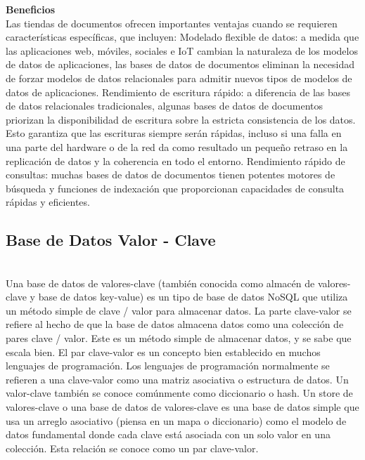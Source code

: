 \documentclass[twoside,onecolumn]{article}
\begin{document}
\begin{flushright}
\begin{itemize}
\textbf{Beneficios}\\
Las tiendas de documentos ofrecen importantes ventajas cuando se requieren características específicas, que incluyen:
Modelado flexible de datos: a medida que las aplicaciones web, móviles, sociales e IoT cambian la naturaleza de los modelos de datos de aplicaciones, las bases de datos de documentos eliminan la necesidad de forzar modelos de datos relacionales para admitir nuevos tipos de modelos de datos de aplicaciones.
Rendimiento de escritura rápido: a diferencia de las bases de datos relacionales tradicionales, algunas bases de datos de documentos priorizan la disponibilidad de escritura sobre la estricta consistencia de los datos. Esto garantiza que las escrituras siempre serán rápidas, incluso si una falla en una parte del hardware o de la red da como resultado un pequeño retraso en la replicación de datos y la coherencia en todo el entorno.
Rendimiento rápido de consultas: muchas bases de datos de documentos tienen potentes motores de búsqueda y funciones de indexación que proporcionan capacidades de consulta rápidas y eficientes.


\subsection{Base de Datos Valor - Clave}
\textbf{}\\Una base de datos de valores-clave (también conocida como almacén de valores-clave y base de datos key-value) es un tipo de base de datos NoSQL que utiliza un método simple de clave / valor para almacenar datos.
La parte clave-valor se refiere al hecho de que la base de datos almacena datos como una colección de pares clave / valor. Este es un método simple de almacenar datos, y se sabe que escala bien.
El par clave-valor es un concepto bien establecido en muchos lenguajes de programación. Los lenguajes de programación normalmente se refieren a una clave-valor como una matriz asociativa o estructura de datos. Un valor-clave también se conoce comúnmente como diccionario o hash.
Un store de valores-clave o una base de datos de valores-clave es una base de datos simple que usa un arreglo asociativo (piensa en un mapa o diccionario) como el modelo de datos fundamental donde cada clave está asociada con un solo valor en una colección. Esta relación se conoce como un par clave-valor.


\end{itemize}
\end{flushright}
\end{document}
